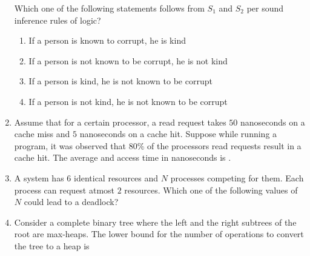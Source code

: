 \documentclass[journal,12pt,onecolumn]{IEEEtran}
\theoremstyle{remark}
\begin{document}
\begin{enumerate}
		Which one of the following statements follows from $S_1$ and $S_2$ per sound inference rules of logic?
		
		\hfill{}
		
		\begin{enumerate}
			\item If a person is known to corrupt, he is kind
			\item If a person is not known to be corrupt, he is not kind
			\item If a person is kind, he is not known to be corrupt
			\item If a person is not kind, he is not known to be corrupt
		\end{enumerate}
		
		\item Assume that for a certain processor, a read request takes $50$ nanoseconds on a cache miss and $5$ nanoseconds on a cache hit. Suppose while running a program, it was observed that $80\%$ of the processors read requests result in a cache hit. The average and access time in nanoseconds is \underline{\hspace{2cm}}.
		
		\hfill{}
		
		\item A system has $6$ identical resources and $N$ processes competing for them. Each process can request atmost $2$ resources. Which one of the following values of $N$ could lead to a deadlock?
		
		\hfill{}
		
		\begin{enumerate}
		\end{enumerate}
		
		\item Consider a complete binary tree where the left and the right subtrees of the root are max-heaps. The lower bound for the number of operations to convert the tree to a heap is
		
		\hfill{\brak{\text{GATE CS 2015}}}
		
		\begin{enumerate}
			\begin{multicols}{4}
				\item $\Theta\brak{\log n}$
				\item $\Theta\brak{n}$
				\item $\Theta\brak{n \log n}$
				\item $\Theta\brak{n^2}$
			\end{multicols}
		\end{enumerate}
		

\end{enumerate}
\end{document}
